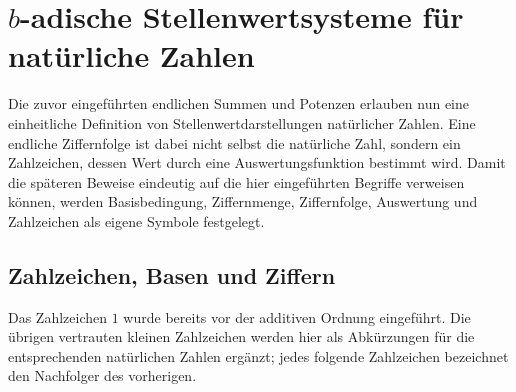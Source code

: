 \documentclass[main.tex]{subfiles}
\begin{document}
\chapter{\(b\)-adische Stellenwertsysteme für natürliche Zahlen}

Die zuvor eingeführten endlichen Summen und Potenzen erlauben nun eine
einheitliche Definition von Stellenwertdarstellungen natürlicher Zahlen. Eine
endliche Ziffernfolge ist dabei nicht selbst die natürliche Zahl, sondern ein
Zahlzeichen, dessen Wert durch eine Auswertungsfunktion bestimmt wird. Damit
die späteren Beweise eindeutig auf die hier eingeführten Begriffe verweisen
können, werden Basisbedingung, Ziffernmenge, Ziffernfolge, Auswertung und
Zahlzeichen als eigene Symbole festgelegt.

\section{Zahlzeichen, Basen und Ziffern}

Das Zahlzeichen \(1\) wurde bereits vor der additiven Ordnung eingeführt.
Die übrigen vertrauten kleinen Zahlzeichen werden hier als Abkürzungen für
die entsprechenden natürlichen Zahlen ergänzt; jedes folgende Zahlzeichen
bezeichnet den Nachfolger des vorherigen.


\begin{tabproof}
\end{tabproof}
\end{document}
